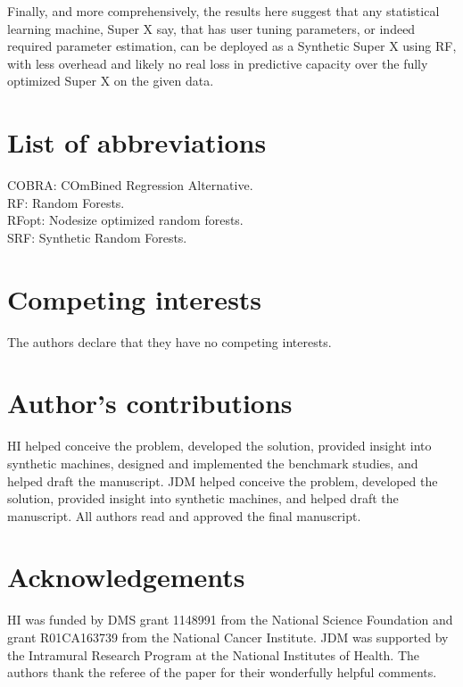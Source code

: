 \documentclass{bmcart}
\def\RFopt{RFopt}
\begin{document}
Finally, and more comprehensively, the results here suggest that any
statistical learning machine, Super X say, that has user tuning
parameters, or indeed required parameter estimation, can be deployed
as a Synthetic Super X using RF, with less overhead and likely
no real loss in predictive capacity over the fully optimized Super X
on the given data.






\begin{backmatter}

\section*{List of abbreviations}
COBRA: COmBined Regression Alternative.\\
RF: Random Forests.\\
\RFopt: Nodesize optimized random forests.\\
SRF: Synthetic Random Forests.

\section*{Competing interests}
The authors declare that they have no competing interests.

\section*{Author's contributions}

HI helped conceive the problem, developed the solution, provided
insight into synthetic machines, designed and implemented the
benchmark studies, and helped draft the manuscript.  JDM helped
conceive the problem, developed the solution, provided insight into
synthetic machines, and helped draft the manuscript.  All authors read
and approved the final manuscript.

\section*{Acknowledgements}
HI was funded by DMS grant 1148991 from the National Science
Foundation and grant R01CA163739 from the National Cancer Institute.
JDM was supported by the Intramural Research Program at the National
Institutes of Health.  The authors thank the referee of the paper for
their wonderfully helpful comments.



\end{backmatter}
\end{document}
